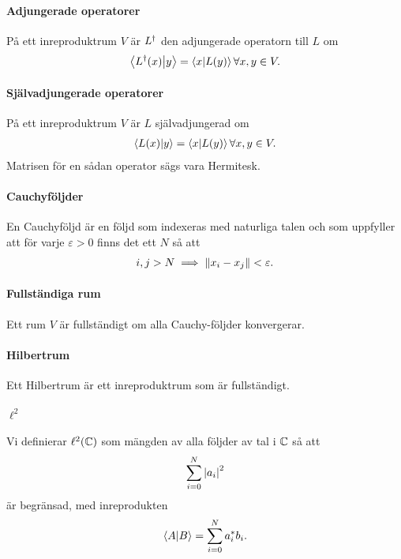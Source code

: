 \paragraph{Adjungerade operatorer}
På ett inreproduktrum $V$ är $L^{\dagger}$ den adjungerade operatorn till $L$ om
\begin{align*}
	\bra{L^{\dagger}(x)}\ket{y} = \bra{x}\ket{L(y)}\forall x, y\in V.
\end{align*}
\paragraph{Självadjungerade operatorer}
På ett inreproduktrum $V$ är $L$ självadjungerad om
\begin{align*}
	\bra{L(x)}\ket{y} = \bra{x}\ket{L(y)}\forall x, y\in V.
\end{align*}
Matrisen för en sådan operator sägs vara Hermitesk.

\paragraph{Cauchyföljder}
En Cauchyföljd är en följd som indexeras med naturliga talen och som uppfyller att för varje $\varepsilon > 0$ finns det ett $N$ så att
\begin{align*}
	i, j > N\implies \norm{x_{i} - x_{j}} < \varepsilon.
\end{align*}

\paragraph{Fullständiga rum}
Ett rum $V$ är fullständigt om alla Cauchy-följder konvergerar.

\paragraph{Hilbertrum}
Ett Hilbertrum är ett inreproduktrum som är fullständigt.

\paragraph{$\ell^{2}$}
Vi definierar $\ell^{2}(\mathbb{C})$ som mängden av alla följder av tal i $\mathbb{C}$ så att
\begin{align*}
	\sum\limits_{i = 0}^{N}\abs{a_{i}}^{2}
\end{align*}
är begränsad, med inreprodukten
\begin{align*}
	\bra{A}\ket{B} = \sum\limits_{i = 0}^{N}a_{i}^{*}b_{i}.
\end{align*}

